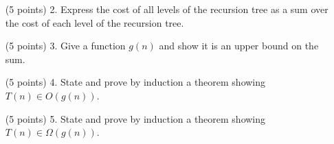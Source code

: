 \documentclass[paper=a4,fontsize=11pt]{article}
\begin{document}
\begin{enumerate}
\begin{enumerate}
\item [(5 points) 2.] Express the cost of all levels of the recursion tree as a sum over the cost of each level of the recursion tree.

\item [(5 points) 3.] Give a function $g (n)$ and show it is an upper bound on the sum.

\item [(5 points) 4.] State and prove by induction a theorem showing $T (n) \in O(g(n))$.

\item [(5 points) 5.] State and prove by induction a theorem showing $T (n) \in \Omega(g(n))$.

\end{enumerate}
\end{enumerate}
\end{document}
